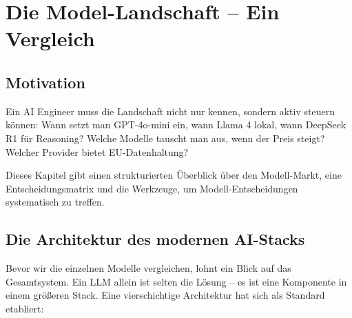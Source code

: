 \chapter{Die Model-Landschaft -- Ein Vergleich}
\label{chap:model_landschaft}


\section{Motivation}


Ein AI Engineer muss die Landschaft nicht nur kennen, sondern aktiv steuern können: Wann setzt man GPT-4o-mini ein, wann Llama 4 lokal, wann DeepSeek R1 für Reasoning? Welche Modelle tauscht man aus, wenn der Preis steigt? Welcher Provider bietet EU-Datenhaltung?

Dieses Kapitel gibt einen strukturierten Überblick über den Modell-Markt, eine Entscheidungsmatrix und die Werkzeuge, um Modell-Entscheidungen systematisch zu treffen.

\section{Die Architektur des modernen AI-Stacks}

Bevor wir die einzelnen Modelle vergleichen, lohnt ein Blick auf das Gesamtsystem. Ein LLM allein ist selten die Lösung -- es ist eine Komponente in einem größeren Stack. Eine vierschichtige Architektur hat sich als Standard etabliert:

